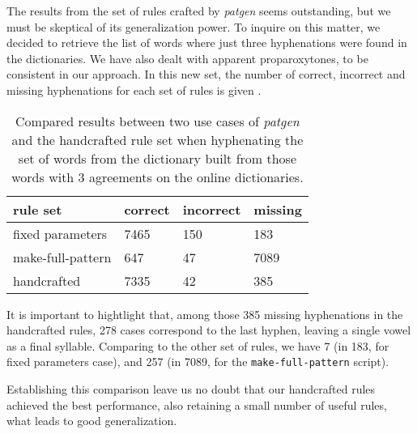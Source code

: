 %
%


The results from the set of rules crafted by \emph{patgen} seems outstanding, but we must be 
skeptical of its generalization power. To inquire on this matter, we decided to retrieve the
list of words where just three hyphenations were found in the dictionaries. We have also dealt
with apparent proparoxytones, to be consistent in our approach.  
In this new set, the number of correct, incorrect and missing hyphenations for each set of rules
is given .

\begin{table}[h]
\centering
\caption{Compared results between two use cases of \emph{patgen} and the handcrafted rule set when hyphenating the set of words from the dictionary built from those words with 3 agreements on the online dictionaries.}\label{tbl-comres-hy3}
\begin{tabular}{llll}
rule set          & correct & incorrect & missing \\
\hline
fixed parameters  & 7465    & 150       & 183 \\
make-full-pattern & 647     & 47        & 7089 \\
handcrafted       & 7335    & 42        & 385 
\end{tabular}
\end{table}

It is important to hightlight that, among those 385 missing hyphenations in the handcrafted rules,
278 cases correspond to the last hyphen, leaving a single vowel as a final syllable.
Comparing to the other set of rules, we have 7 (in 183, for fixed parameters case), and 257 (in 7089, 
for the \texttt{make-full-pattern} script).

Establishing this comparison leave us no doubt that our handcrafted rules achieved the best
performance, also retaining a small number of useful rules, what leads to good generalization.





